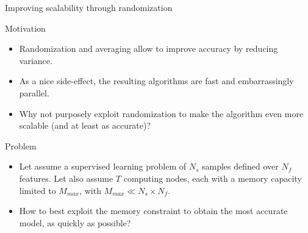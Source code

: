 \documentclass{beamer}
\begin{document}
\begin{frame}{Improving scalability through randomization}

\begin{block}{Motivation}
\begin{itemize}
\item Randomization and averaging allow to improve accuracy by reducing variance.
\item As a nice side-effect, the resulting algorithms are fast and
  embarrassingly parallel.
\item Why not purposely exploit randomization to make the algorithm
  even more scalable (and at least as accurate)?
\end{itemize}
\end{block}

\begin{block}{Problem}
\begin{itemize}
\item Let assume a supervised learning problem of $N_s$ samples defined over $N_f$ features.
Let also assume $T$ computing nodes, each with a
  memory capacity limited to $M_{max}$, with $M_{max}\ll N_s \times N_f$.
\item How to best exploit the memory constraint to obtain the most accurate model, as quickly as possible?
\end{itemize}
\end{block}

\end{frame}
\end{document}
